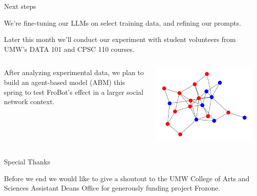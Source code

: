 \documentclass[12pt]{beamer}
\begin{document}
\begin{frame}[c]{Next steps}

We're fine-tuning our LLMs on select training data, and refining our prompts.

\pause
Later this month we'll conduct our experiment with student volunteers from UMW's DATA 101 and CPSC 110 courses.
\pause


\begin{columns}[c,onlytextwidth]
  \begin{column}{0.6\textwidth}
After analyzing experimental data, we plan to build an agent-based model (ABM) this spring to test FroBot's effect in a larger social network context.
  \end{column}
  \begin{column}{0.4\textwidth}
    \includegraphics[width=\linewidth]{agraph.png}
  \end{column}
\end{columns}

\end{frame}
\begin{frame}[c]{Special Thanks }

Before we end we would like to give a shoutout to the UMW College of Arts and Sciences Assistant Deans Office for generously funding project Frozone.

\end{frame}
\end{document}
